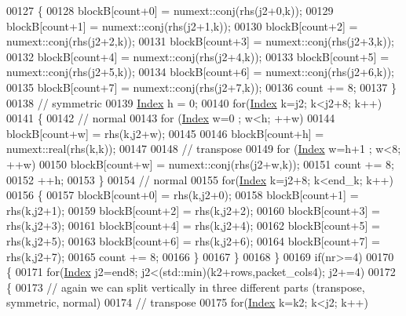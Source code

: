 \begin{DoxyCode}
00127         \{
00128           blockB[count+0] = numext::conj(rhs(j2+0,k));
00129           blockB[count+1] = numext::conj(rhs(j2+1,k));
00130           blockB[count+2] = numext::conj(rhs(j2+2,k));
00131           blockB[count+3] = numext::conj(rhs(j2+3,k));
00132           blockB[count+4] = numext::conj(rhs(j2+4,k));
00133           blockB[count+5] = numext::conj(rhs(j2+5,k));
00134           blockB[count+6] = numext::conj(rhs(j2+6,k));
00135           blockB[count+7] = numext::conj(rhs(j2+7,k));
00136           count += 8;
00137         \}
00138         \textcolor{comment}{// symmetric}
00139         \hyperlink{namespace_eigen_a62e77e0933482dafde8fe197d9a2cfde}{Index} h = 0;
00140         \textcolor{keywordflow}{for}(\hyperlink{namespace_eigen_a62e77e0933482dafde8fe197d9a2cfde}{Index} k=j2; k<j2+8; k++)
00141         \{
00142           \textcolor{comment}{// normal}
00143           \textcolor{keywordflow}{for} (\hyperlink{namespace_eigen_a62e77e0933482dafde8fe197d9a2cfde}{Index} w=0 ; w<h; ++w)
00144             blockB[count+w] = rhs(k,j2+w);
00145 
00146           blockB[count+h] = numext::real(rhs(k,k));
00147 
00148           \textcolor{comment}{// transpose}
00149           \textcolor{keywordflow}{for} (\hyperlink{namespace_eigen_a62e77e0933482dafde8fe197d9a2cfde}{Index} w=h+1 ; w<8; ++w)
00150             blockB[count+w] = numext::conj(rhs(j2+w,k));
00151           count += 8;
00152           ++h;
00153         \}
00154         \textcolor{comment}{// normal}
00155         \textcolor{keywordflow}{for}(\hyperlink{namespace_eigen_a62e77e0933482dafde8fe197d9a2cfde}{Index} k=j2+8; k<end\_k; k++)
00156         \{
00157           blockB[count+0] = rhs(k,j2+0);
00158           blockB[count+1] = rhs(k,j2+1);
00159           blockB[count+2] = rhs(k,j2+2);
00160           blockB[count+3] = rhs(k,j2+3);
00161           blockB[count+4] = rhs(k,j2+4);
00162           blockB[count+5] = rhs(k,j2+5);
00163           blockB[count+6] = rhs(k,j2+6);
00164           blockB[count+7] = rhs(k,j2+7);
00165           count += 8;
00166         \}
00167       \}
00168     \}
00169     \textcolor{keywordflow}{if}(nr>=4)
00170     \{
00171       \textcolor{keywordflow}{for}(\hyperlink{namespace_eigen_a62e77e0933482dafde8fe197d9a2cfde}{Index} j2=end8; j2<(std::min)(k2+rows,packet\_cols4); j2+=4)
00172       \{
00173         \textcolor{comment}{// again we can split vertically in three different parts (transpose, symmetric, normal)}
00174         \textcolor{comment}{// transpose}
00175         \textcolor{keywordflow}{for}(\hyperlink{namespace_eigen_a62e77e0933482dafde8fe197d9a2cfde}{Index} k=k2; k<j2; k++)

\end{DoxyCode}
